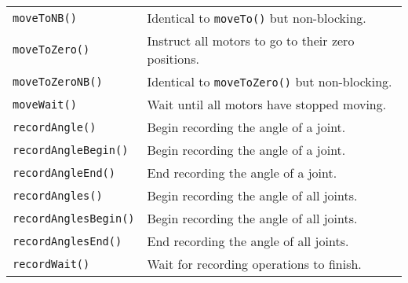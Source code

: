 \begin{table}[!h]
\begin{center}
\begin{tabular}{p{48 mm}p{110 mm}}
\texttt{moveToNB()} & Identical to \texttt{moveTo()} but non-blocking. \\
\texttt{moveToZero()} & Instruct all motors to go to their zero positions. \\
\texttt{moveToZeroNB()} & Identical to \texttt{moveToZero()} but non-blocking. \\
\texttt{moveWait()} & Wait until all motors have stopped moving. \\
\texttt{recordAngle()} & Begin recording the angle of a joint. \\
\texttt{recordAngleBegin()} & Begin recording the angle of a joint. \\
\texttt{recordAngleEnd()} & End recording the angle of a joint. \\
\texttt{recordAngles()} & Begin recording the angle of all joints. \\
\texttt{recordAnglesBegin()} & Begin recording the angle of all joints. \\
\texttt{recordAnglesEnd()} & End recording the angle of all joints. \\
\texttt{recordWait()} & Wait for recording operations to finish. \\
\hline
\end{tabular}
\end{center}
\label{mobilec_api_cbinary}
\end{table}

\addtocounter{table}{-1}


